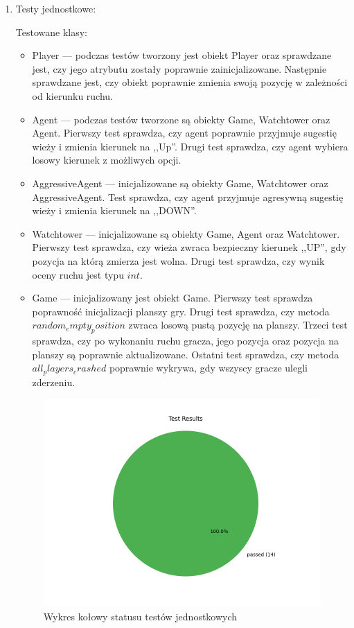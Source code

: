 \documentclass[12pt,a4paper]{article}
\begin{document}
\begin{enumerate}
    \item Testy jednostkowe:
    
        Testowane klasy:
        \begin{itemize}
            \item Player ---
                podczas testów tworzony jest obiekt Player oraz sprawdzane jest, czy jego atrybutu zostały poprawnie zainicjalizowane. Następnie sprawdzane jest, czy obiekt poprawnie zmienia swoją pozycję w zależności od kierunku ruchu. 
            \item Agent --- podczas testów tworzone są obiekty Game, Watchtower oraz Agent. Pierwszy test sprawdza, czy agent poprawnie przyjmuje sugestię wieży i zmienia kierunek na ,,Up''. Drugi test sprawdza, czy agent wybiera losowy kierunek z możliwych opcji.
            \item AggressiveAgent --- inicjalizowane są obiekty Game, Watchtower oraz AggressiveAgent. Test sprawdza, czy agent przyjmuje agresywną sugestię wieży i zmienia kierunek na ,,DOWN''.
            \item Watchtower --- inicjalizowane są obiekty Game, Agent oraz Watchtower. Pierwszy test sprawdza, czy wieża zwraca bezpieczny kierunek ,,UP'', gdy pozycja na którą zmierza jest wolna. Drugi test sprawdza, czy wynik oceny ruchu jest typu $int$.
            \item Game --- inicjalizowany jest obiekt Game. Pierwszy test sprawdza poprawność inicjalizacji planszy gry. Drugi test sprawdza, czy metoda $random_empty_position$ zwraca losową pustą pozycję na planszy. Trzeci test sprawdza, czy po wykonaniu ruchu gracza, jego pozycja oraz pozycja na planszy są poprawnie aktualizowane. Ostatni test sprawdza, czy metoda $all_players_crashed$ poprawnie wykrywa, gdy wszyscy gracze ulegli zderzeniu.
        \end{itemize}

        \begin{figure}[H]
            \centering
            \includegraphics[width=0.8\linewidth]{media/wykresy/unittest.png}
            \caption{Wykres kołowy statusu testów jednostkowych}
            \label{fig:enter-label}
        \end{figure}


\end{enumerate}
\end{document}

